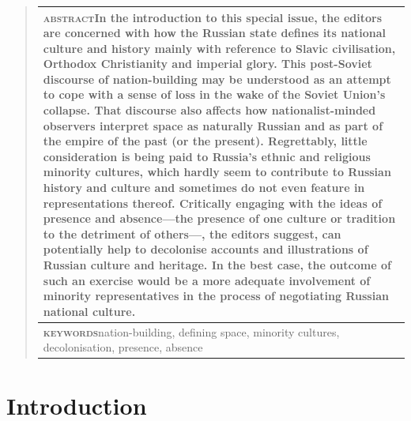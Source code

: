 \documentclass[
  english,
  a4paper,
  DIV=12,
  footlines=2.1,
  usegeometry=true]{scrartcl}
\begin{document}
\begin{quote}
\small
\begin{tabular}{@{}p{\linewidth}@{}}
\toprule
{\bfseries\scshape abstract}\hspace{1em}In the introduction to this
special issue, the editors are concerned with how the Russian state
defines its national culture and history mainly with reference to Slavic
civilisation, Orthodox Christianity and imperial glory. This post-Soviet
discourse of nation-building may be understood as an attempt to cope
with a sense of loss in the wake of the Soviet Union's collapse. That
discourse also affects how nationalist-minded observers interpret space
as naturally Russian and as part of the empire of the past (or the
present). Regrettably, little consideration is being paid to Russia's
ethnic and religious minority cultures, which hardly seem to contribute
to Russian history and culture and sometimes do not even feature in
representations thereof. Critically engaging with the ideas of presence
and absence---the presence of one culture or tradition to the detriment
of others---, the editors suggest, can potentially help to decolonise
accounts and illustrations of Russian culture and heritage. In the best
case, the outcome of such an exercise would be a more adequate
involvement of minority representatives in the process of negotiating
Russian national culture.\\
\midrule[\heavyrulewidth]
{\bfseries\scshape keywords}\hspace{1em}nation-building, defining
space, minority cultures, decolonisation, presence, absence\\
\bottomrule
\end{tabular}
\end{quote}
\vspace{1.8181\baselineskip} %

\hypertarget{introduction}{%
\section{Introduction}\label{introduction}}
\end{document}
